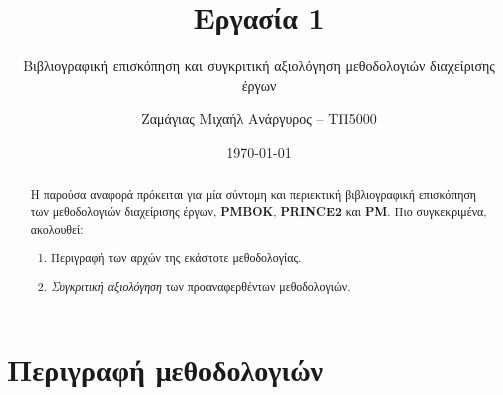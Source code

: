 \documentclass[12pt]{turabian-researchpaper}
\title{Εργασία 1}
\subtitle{Βιβλιογραφική επισκόπηση και συγκριτική αξιολόγηση μεθοδολογιών διαχείρισης έργων}
\author{Ζαμάγιας Μιχαήλ Ανάργυρος -- ΤΠ5000}
\date{\today}
\begin{document}
\begin{titlepage}
    \maketitle
\end{titlepage}

\begin{abstract}
    Η παρούσα αναφορά πρόκειται για μία σύντομη και περιεκτική βιβλιογραφική επισκόπηση των μεθοδολογιών διαχείρισης έργων, \textbf{PMBOK},
    \textbf{PRINCE2} και \textbf{PM}.
    Πιο συγκεκριμένα, ακολουθεί:
    \begin{enumerate}[itemsep=2pt]
        \item Περιγραφή των αρχών της εκάστοτε μεθοδολογίας.
        \item \textit{Συγκριτική αξιολόγηση} των προαναφερθέντων μεθοδολογιών.
    \end{enumerate}
\end{abstract}

\tableofcontents

\newpage

\section{Περιγραφή μεθοδολογιών}\label{methods}
\end{document}
